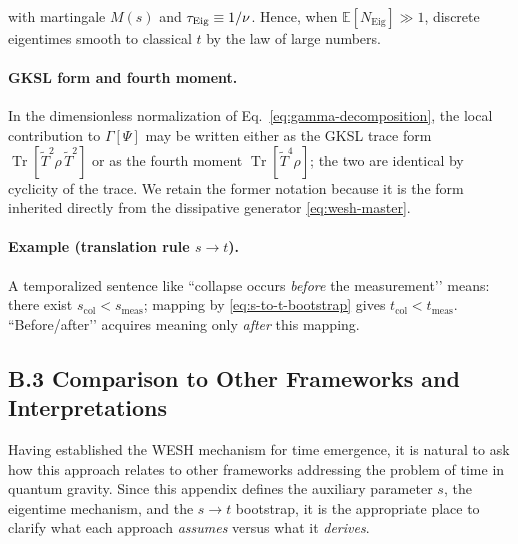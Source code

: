 \documentclass[12pt,a4paper]{article}
\renewcommand{\Tr}{\operatorname{Tr}}
\numberwithin{equation}{section}
\begin{document}
\vspace{0.5cm}

\noindent with martingale $M(s)$ and $\tau_{\rm Eig}\equiv 1/\nu$. Hence, when $\mathbb{E}[N_{\mathrm{Eig}}]\gg1$, discrete eigentimes smooth to classical $t$ by the law of large numbers.

\vspace{0.5cm}

\paragraph{GKSL form and fourth moment.}
In the dimensionless normalization of Eq.~\eqref{eq:gamma-decomposition},
the local contribution to $\Gamma[\Psi]$ may be written either as the GKSL
trace form $\Tr[\tilde T^{2}\rho\,\tilde T^{2}]$ or as the fourth moment
$\Tr[\tilde T^{4}\rho]$; the two are identical by cyclicity of the trace.
We retain the former notation because it is the form inherited directly
from the dissipative generator \eqref{eq:wesh-master}.

\vspace{0.5cm}

\paragraph{Example (translation rule $s\to t$).}
A temporalized sentence like “collapse occurs \emph{before} the measurement’’ means: there exist $s_{\mathrm{col}}<s_{\mathrm{meas}}$; mapping by \eqref{eq:s-to-t-bootstrap} gives $t_{\mathrm{col}}<t_{\mathrm{meas}}$. “Before/after’’ acquires meaning only \emph{after} this mapping.

\vspace{0.8cm}

\subsection*{B.3 Comparison to Other Frameworks and Interpretations}

\vspace{0.5cm}

Having established the WESH mechanism for time emergence, it is natural to ask how this approach relates to other frameworks addressing the problem of time in quantum gravity. Since this appendix defines the auxiliary parameter $s$, the eigentime mechanism, and the $s \to t$ bootstrap, it is the appropriate place to clarify what each approach \emph{assumes} versus what it \emph{derives}.
\end{document}
